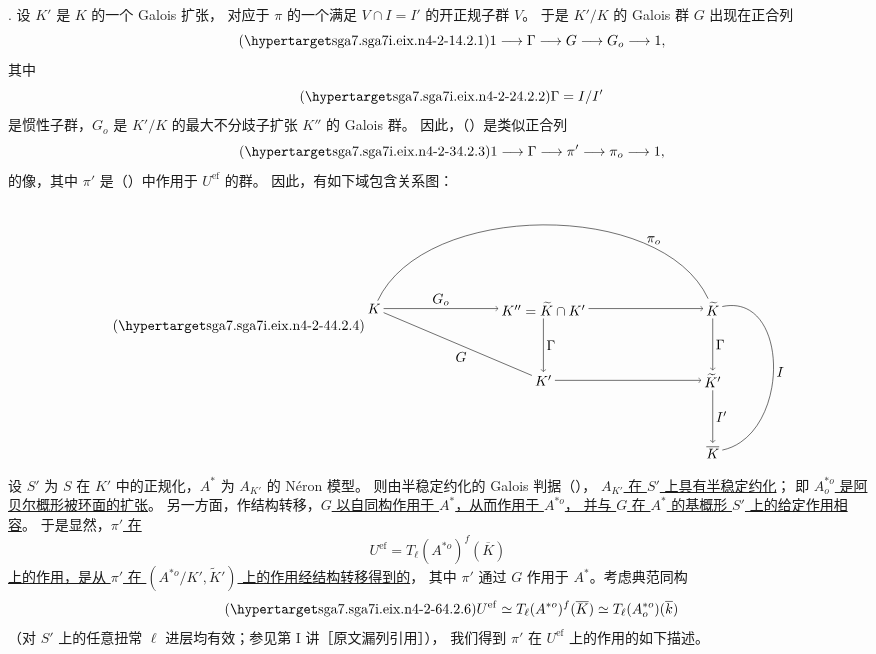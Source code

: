 \medskip
\noindent
{}. 设 $K'$ 是 $K$ 的一个 Galois 扩张，
对应于 $\pi$ 的一个满足 $V\cap I=I'$ 的开正规子群 $V$。
于是 $K'/K$ 的 Galois 群 $G$ 出现在正合列
\begin{equation}\tag{\SGARefTarget{sga7.sga7i.eix.n4-2-1}{4.2.1}}
 1\longrightarrow\Gamma\longrightarrow G\longrightarrow G_o
 \longrightarrow1,
\end{equation}
其中
\begin{equation}\tag{\SGARefTarget{sga7.sga7i.eix.n4-2-2}{4.2.2}}
 \Gamma=I/I'
\end{equation}
是惯性子群，$G_o$ 是 $K'/K$ 的最大不分歧子扩张 $K''$ 的 Galois 群。
因此，（）是类似正合列
\begin{equation}\tag{\SGARefTarget{sga7.sga7i.eix.n4-2-3}{4.2.3}}
 1\longrightarrow\Gamma\longrightarrow\pi'\longrightarrow\pi_o
 \longrightarrow1,
\end{equation}
的像，其中 $\pi'$ 是（）中作用于 $U^{\mathrm{ef}}$ 的群。
因此，有如下域包含关系图：
\begin{equation}\tag{\SGARefTarget{sga7.sga7i.eix.n4-2-4}{4.2.4}}
\begin{tikzpicture}[baseline=(current bounding box.center),
  every node/.style={inner sep=2pt}]
  \node (K) at (0,0) {$K$};
  \node (Ktwo) at (4.25,0) {$K''=\widetilde K\cap K'$};
  \node (Kt) at (8.5,0) {$\widetilde K$};
  \node (Kp) at (4.25,-1.8) {$K'$};
  \node (Ktp) at (8.5,-1.8) {$\widetilde K'$};
  \node (Kb) at (8.5,-3.6) {$\overline K$};
  \draw[->] (K) -- node[above] {$G_o$} (Ktwo);
  \draw[->] (Ktwo) -- (Kt);
  \draw[->] (Ktwo) -- node[right] {$\Gamma$} (Kp);
  \draw[->] (Kp) -- (Ktp);
  \draw[->] (Kt) -- node[right] {$\Gamma$} (Ktp);
  \draw[->] (Ktp) -- node[right] {$I'$} (Kb);
  \draw[-] (K) -- node[below left,pos=.58] {$G$} (Kp);
  \draw[-] (K) to[out=65,in=115,looseness=.85]
    node[above,pos=.78] {$\pi_o$} (Kt);
  \draw[-] (Kt) to[out=12,in=12,looseness=1.25]
    node[right,pos=.52] {$I$} (Kb);
\end{tikzpicture}
\end{equation}

设 $S'$ 为 $S$ 在 $K'$ 中的正规化，$A^*$ 为 $A_{K'}$ 的 N\'eron 模型。
则由半稳定约化的 Galois 判据（），
\underline{$A_{K'}$ 在 $S'$ 上具有半稳定约化}；
即 \underline{$A^{*o}_o$ 是阿贝尔概形被环面的扩张}。
另一方面，作结构转移，\underline{$G$ 以自同构作用于 $A^*$，从而作用于 $A^{*o}$，
并与 $G$ 在 $A^*$ 的基概形 $S'$ 上的给定作用相容}。
于是显然，\underline{$\pi'$ 在}
\[
 U^{\mathrm{ef}}=T_\ell(A^{*o})^f(\overline K)
\]
\underline{上的作用，是从 $\pi'$ 在 $(A^{*o}/K',\widetilde K')$ 上的作用经结构转移得到的}，
其中 $\pi'$ 通过 $G$ 作用于 $A^*$。考虑典范同构
\begin{equation}\tag{\SGARefTarget{sga7.sga7i.eix.n4-2-6}{4.2.6}}
 U^{\mathrm{ef}}\simeq T_\ell(A^{*o})^f(\overline K)
 \simeq T_\ell(A^{*o}_o)(\overline k)
\end{equation}
（对 $S'$ 上的任意扭常 $\ell$ 进层均有效；参见第 I 讲［原文漏列引用］），
我们得到 $\pi'$ 在 $U^{\mathrm{ef}}$ 上的作用的如下描述。

